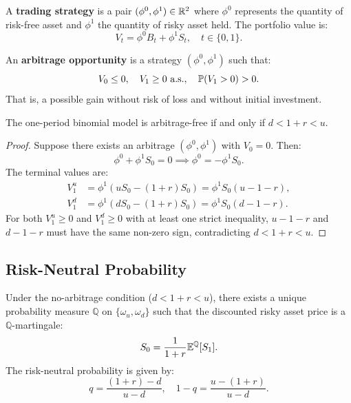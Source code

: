 \begin{definition}
A \textbf{trading strategy} is a pair $(\phi^0, \phi^1) \in \mathbb{R}^2$ where
$\phi^0$ represents the quantity of risk-free asset and $\phi^1$ the quantity
of risky asset held. The portfolio value is:
\[
    V_t = \phi^0 B_t + \phi^1 S_t, \quad t \in \{0,1\}.
\]
\end{definition}

\begin{definition}
An \textbf{arbitrage opportunity} is a strategy $(\phi^0, \phi^1)$ such that:
\[
    V_0 \leq 0, \quad V_1 \geq 0 \text{ a.s.}, \quad \mathbb{P}(V_1 > 0) > 0.
\]
That is, a possible gain without risk of loss and without initial investment.
\end{definition}

\begin{theorem}
The one-period binomial model is arbitrage-free if and only if $d < 1+r < u$.
\end{theorem}

\begin{proof}
Suppose there exists an arbitrage $(\phi^0, \phi^1)$ with $V_0 = 0$. Then:
\[
    \phi^0 + \phi^1 S_0 = 0 \implies \phi^0 = -\phi^1 S_0.
\]
The terminal values are:
\begin{align*}
    V_1^u &= \phi^1(uS_0 - (1+r)S_0) = \phi^1 S_0(u - 1 - r), \\
    V_1^d &= \phi^1(dS_0 - (1+r)S_0) = \phi^1 S_0(d - 1 - r).
\end{align*}
For both $V_1^u \geq 0$ and $V_1^d \geq 0$ with at least one strict
inequality, $u - 1 - r$ and $d - 1 - r$ must have the same non-zero sign,
contradicting $d < 1+r < u$.
\end{proof}

\subsection{Risk-Neutral Probability}

\begin{theorem}
\label{thm:risk_neutral}
Under the no-arbitrage condition ($d < 1+r < u$), there exists a unique
probability measure $\mathbb{Q}$ on $\{\omega_u, \omega_d\}$ such that the
discounted risky asset price is a $\mathbb{Q}$-martingale:
\[
    S_0 = \frac{1}{1+r}\mathbb{E}^\mathbb{Q}[S_1].
\]
The risk-neutral probability is given by:
\[
    q = \frac{(1+r) - d}{u - d}, \quad 1-q = \frac{u - (1+r)}{u - d}.
\]
\end{theorem}


